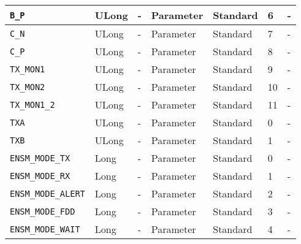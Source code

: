 \documentclass{article}
\begin{document}
\begin{landscape}
\begin{scriptsize}
\begin{longtable}{|p{3.6cm}|p{8.1cm}|p{1.4cm}|p{1.3cm}|p{1.4cm}|p{2.5cm}|p{3.6cm}|}
			\hline
      \verb+B_P+                       & ULong        & -               & Parameter             & Standard                         & 6                   & - \\
			\hline
      \verb+C_N+                       & ULong        & -               & Parameter             & Standard                         & 7                   & - \\
			\hline
      \verb+C_P+                       & ULong        & -               & Parameter             & Standard                         & 8                   & - \\
			\hline
      \verb+TX_MON1+                   & ULong        & -               & Parameter             & Standard                         & 9                   & - \\
			\hline
      \verb+TX_MON2+                   & ULong        & -               & Parameter             & Standard                         & 10                  & - \\
			\hline
      \verb+TX_MON1_2+                 & ULong        & -               & Parameter             & Standard                         & 11                  & - \\
			\hline
      \verb+TXA+                       & ULong        & -               & Parameter             & Standard                         & 0                   & - \\
			\hline
      \verb+TXB+                       & ULong        & -               & Parameter             & Standard                         & 1                   & - \\
			\hline
      \verb+ENSM_MODE_TX+              & Long         & -               & Parameter             & Standard                         & 0                   & - \\
			\hline
      \verb+ENSM_MODE_RX+              & Long         & -               & Parameter             & Standard                         & 1                   & - \\
			\hline
      \verb+ENSM_MODE_ALERT+           & Long         & -               & Parameter             & Standard                         & 2                   & - \\
			\hline
      \verb+ENSM_MODE_FDD+             & Long         & -               & Parameter             & Standard                         & 3                   & - \\
			\hline
      \verb+ENSM_MODE_WAIT+            & Long         & -               & Parameter             & Standard                         & 4                   & - \\

\end{longtable}
\end{scriptsize}
\end{landscape}
\end{document}
